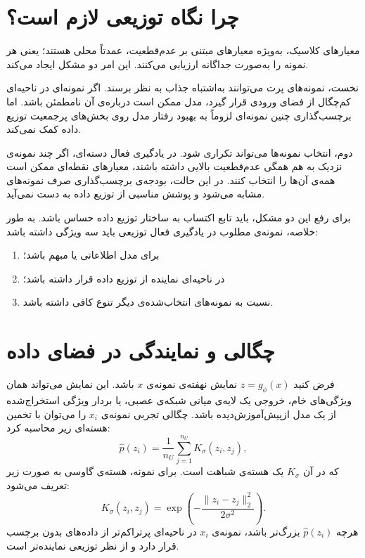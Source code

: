 \documentclass[12pt,a4paper,oneside]{report}
\begin{document}
\section{چرا نگاه توزیعی لازم است؟}
\label{sec:dal_why_distribution}

معیارهای کلاسیک، به‌ویژه معیارهای مبتنی بر عدم‌قطعیت، عمدتاً محلی هستند؛ یعنی هر نمونه را به‌صورت جداگانه ارزیابی می‌کنند. این امر دو مشکل ایجاد می‌کند.

نخست، نمونه‌های پرت می‌توانند به‌اشتباه جذاب به نظر برسند. اگر نمونه‌ای در ناحیه‌ای کم‌چگال از فضای ورودی قرار گیرد، مدل ممکن است درباره‌ی آن نامطمئن باشد. اما برچسب‌گذاری چنین نمونه‌ای لزوماً به بهبود رفتار مدل روی بخش‌های پرجمعیت توزیع داده کمک نمی‌کند.

دوم، انتخاب نمونه‌ها می‌تواند تکراری شود. در یادگیری فعال دسته‌ای، اگر چند نمونه‌ی نزدیک به هم همگی عدم‌قطعیت بالایی داشته باشند، معیارهای نقطه‌ای ممکن است همه‌ی آن‌ها را انتخاب کنند. در این حالت، بودجه‌ی برچسب‌گذاری صرف نمونه‌های مشابه می‌شود و پوشش مناسبی از توزیع داده به دست نمی‌آید.

برای رفع این دو مشکل، باید تابع اکتساب به ساختار توزیع داده حساس باشد. به طور خلاصه، نمونه‌ی مطلوب در یادگیری فعال توزیعی باید سه ویژگی داشته باشد:
\begin{enumerate}[label=\arabic*)]
\item برای مدل اطلاعاتی یا مبهم باشد؛
\item در ناحیه‌ای نماینده از توزیع داده قرار داشته باشد؛
\item نسبت به نمونه‌های انتخاب‌شده‌ی دیگر تنوع کافی داشته باشد.
\end{enumerate}

\section{چگالی و نمایندگی در فضای داده}
\label{sec:dal_density}

فرض کنید $z=g_\phi(x)$ نمایش نهفته‌ی نمونه‌ی $x$ باشد. این نمایش می‌تواند همان ویژگی‌های خام، خروجی یک لایه‌ی میانی شبکه‌ی عصبی، یا بردار ویژگی استخراج‌شده از یک مدل ازپیش‌آموزش‌دیده باشد. چگالی تجربی نمونه‌ی $x_i$ را می‌توان با تخمین هسته‌ای زیر محاسبه کرد:
\begin{equation}
\widehat p(z_i)=\frac{1}{n_U}\sum_{j=1}^{n_U}K_\sigma(z_i,z_j),
\end{equation}
که در آن $K_\sigma$ یک هسته‌ی شباهت است. برای نمونه، هسته‌ی گاوسی به صورت زیر تعریف می‌شود:
\begin{equation}
K_\sigma(z_i,z_j)=\exp\left(-\frac{\|z_i-z_j\|_2^2}{2\sigma^2}\right).
\end{equation}
هرچه $\widehat p(z_i)$ بزرگ‌تر باشد، نمونه‌ی $x_i$ در ناحیه‌ای پرتراکم‌تر از داده‌های بدون برچسب قرار دارد و از نظر توزیعی نماینده‌تر است.
\end{document}
